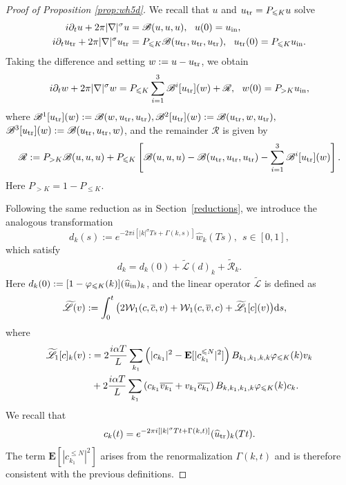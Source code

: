 \documentclass[UTF-8,reqno]{amsart}
\numberwithin{equation}{section}
\theoremstyle{definition}
\def\dif{{\mathord{{\rm d}}}}
\def\leq{\leqslant}
\def\dif{{\mathord{{\rm d}}}}
\def\leq{\leqslant}
\begin{document}
\begin{proof}[Proof of Proposition \ref{prop:wh5d}]

We recall that $u$ and $u_{\rm tr}=P_{\leq K} u$ solve
\begin{align*}
    i \partial_t u +2\pi |\nabla|^\sigma u&= \mathscr{B}(u,u,u),\ \ u(0)=u_{\rm in},\\
     i \partial_t u_{\rm tr} +2\pi |\nabla|^\sigma u_{\rm tr}&=P_{\leq K} \mathscr{B}(u_{\rm tr},u_{\rm tr},u_{\rm tr}),\ \ u_{\rm tr}(0)=P_{\leq K}  u_{\rm in}.
\end{align*}
Taking the difference and setting $w:=u-u_{\rm tr}$, we obtain
\begin{align*}
    i \partial_t w +2\pi |\nabla|^\sigma w=P_{\leq K}\sum_{i=1}^3 \mathscr{B}^i[u_{\rm tr}](w)+\mathscr R,\ \ w(0)=P_{> K} u_{\rm in},
\end{align*}
where   $\mathscr{B}^1[u_{\rm tr}](w):=\mathscr{B}(w,u_{\rm tr},u_{\rm tr}),\mathscr{B}^2[u_{\rm tr}](w):=\mathscr{B}(u_{\rm tr},w,u_{\rm tr}),$ $\mathscr{B}^3[u_{\rm tr}](w):=\mathscr{B}(u_{\rm tr},u_{\rm tr},w)$, and the remainder $\mathscr R$ is given by 
\begin{align*}
    \mathscr R:=P_{>K} \mathscr{B}(u,u,u)+P_{\leq K}\left[\mathscr{B}(u,u,u)-\mathscr{B}(u_{\rm tr},u_{\rm tr},u_{\rm tr})- \sum_{
    i=1}^3 \mathscr{B}^i[u_{\rm tr}](w)\right].
\end{align*}
Here  $P_{>K}=1-P_{\leq K}$.

Following the same reduction as in Section~\ref{reductions}, we introduce the analogous transformation
$$d_k(s):= e^{-2\pi i[|k|^\sigma Ts+\Gamma(k,s)]} \widehat w_k(Ts),\ \ s\in[0,1],$$
which satisfy
\begin{align}
    d_k=d_k(0)+\widetilde{\mathscr{L}}( d)_k+\tilde{\mathscr{R}}_k.\label{eq:overck}
\end{align}
Here $d_k(0):=[1-\varphi_{\leq K}(k)](\widehat{u}_{\rm in})_k$, and the linear operator $\widetilde{\mathscr{L}}$ is defined as 
\begin{align}
\widetilde{\mathscr{L}}(v)&:=\int_0^t \big(2\mathcal{W}_1(c,\overline c, v)+\mathcal{W}_1(c, \overline  v, c)+\widetilde{\mathscr{L}_1}[c](v)\big)\dif s,  \notag
\end{align} 
    where
\begin{align}
\widetilde{\mathscr{L}_1}[c]_k(v):&=2\frac{i\alpha T}{L}\sum_{k_1}\left(|c_{k_1}|^2 -\mathbf{E}[|c^{\leq N}_{k_1}|^2] \right) B_{k_1,k_1,k,k}\varphi_{\leq K}(k)v_k\notag\\
&+2\frac{i\alpha T}{L}\sum_{k_1}\left(c_{k_1}\overline {v_{k_1}}+v_{k_1}\overline {c_{k_1}} \right) B_{k,k_1,k_1,k}\varphi_{\leq K}(k)c_k.\notag
\end{align}
We recall that $$ c_k(t)= e^{-2\pi i[|k|^\sigma Tt+\Gamma(k,t)]} (\widehat u_{\rm tr})_k(Tt).$$ The term $\mathbf{E}[|c^{\leq N}_{k_1}|^2]$ arises from the renormalization $\Gamma(k,t)$ and is therefore consistent with the previous definitions. 


\end{proof}
\end{document}

